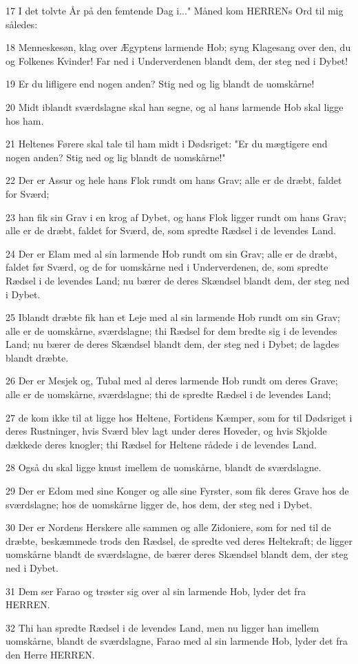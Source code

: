 \par 17 I det tolvte År på den femtende Dag i..." Måned kom HERRENs Ord til mig således:
\par 18 Menneskesøn, klag over Ægyptens larmende Hob; syng Klagesang over den, du og Folkenes Kvinder! Far ned i Underverdenen blandt dem, der steg ned i Dybet!
\par 19 Er du lifligere end nogen anden? Stig ned og lig blandt de uomskårne!
\par 20 Midt iblandt sværdslagne skal han segne, og al hans larmende Hob skal ligge hos ham.
\par 21 Heltenes Førere skal tale til ham midt i Dødsriget: "Er du mægtigere end nogen anden? Stig ned og lig blandt de uomskårne!"
\par 22 Der er Assur og hele hans Flok rundt om hans Grav; alle er de dræbt, faldet for Sværd;
\par 23 han fik sin Grav i en krog af Dybet, og hans Flok ligger rundt om hans Grav; alle er de dræbt, faldet for Sværd, de, som spredte Rædsel i de levendes Land.
\par 24 Der er Elam med al sin larmende Hob rundt om sin Grav; alle er de dræbt, faldet før Sværd, og de for uomskårne ned i Underverdenen, de, som spredte Rædsel i de levendes Land; nu bærer de deres Skændsel blandt dem, der steg ned i Dybet.
\par 25 Iblandt dræbte fik han et Leje med al sin larmende Hob rundt om sin Grav; alle er de uomskårne, sværdslagne; thi Rædsel for dem bredte sig i de levendes Land; nu bærer de deres Skændsel blandt dem, der steg ned i Dybet; de lagdes blandt dræbte.
\par 26 Der er Mesjek og, Tubal med al deres larmende Hob rundt om deres Grave; alle er de uomskårne, sværdslagne; thi de spredte Rædsel i de levendes Land;
\par 27 de kom ikke til at ligge hos Heltene, Fortidens Kæmper, som for til Dødsriget i deres Rustninger, hvis Sværd blev lagt under deres Hoveder, og hvis Skjolde dækkede deres knogler; thi Rædsel for Heltene rådede i de levendes Land.
\par 28 Også du skal ligge knust imellem de uomskårne, blandt de sværdslagne.
\par 29 Der er Edom med sine Konger og alle sine Fyrster, som fik deres Grave hos de sværdslagne; hos de uomskårne ligger de, hos dem, der steg ned i Dybet.
\par 30 Der er Nordens Herskere alle sammen og alle Zidoniere, som for ned til de dræbte, beskæmmede trods den Rædsel, de spredte ved deres Heltekraft; de ligger uomskårne blandt de sværdslagne, de bærer deres Skændsel blandt dem, der steg ned i Dybet.
\par 31 Dem ser Farao og trøster sig over al sin larmende Hob, lyder det fra HERREN.
\par 32 Thi han spredte Rædsel i de levendes Land, men nu ligger han imellem uomskårne, blandt de sværdslagne, Farao med al sin larmende Hob, lyder det fra den Herre HERREN.

